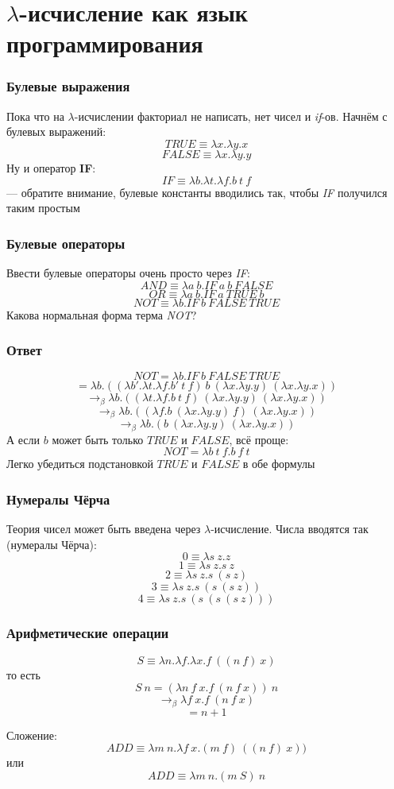 \documentclass[xetex,mathserif,serif]{beamer}
\begin{document}
	\section{$\lambda$-исчисление как язык программирования}

	\begin{frame}
		\frametitle{Булевые выражения}
		Пока что на $\lambda$-исчислении факториал не написать, нет чисел и \textit{if}-ов. Начнём с булевых выражений:
		$$TRUE \equiv \lambda x.\lambda y.x$$
		$$FALSE \equiv \lambda x.\lambda y.y$$
		Ну и оператор \textbf{IF}:
		$$IF \equiv \lambda b.\lambda t.\lambda f.b\ t\ f$$
		--- обратите внимание, булевые константы вводились так, чтобы \textit{IF} получился таким простым
	\end{frame}

	\begin{frame}
		\frametitle{Булевые операторы}
		Ввести булевые операторы очень просто через \textit{IF}:
		$$AND \equiv \lambda a\ b. IF\ a\ b\ FALSE$$
		$$OR \equiv \lambda a\ b. IF\ a\ TRUE\ b$$
		$$NOT \equiv \lambda b.IF\ b\ FALSE\ TRUE$$
		Какова нормальная форма терма \textit{NOT}?
	\end{frame}

	\begin{frame}
		\frametitle{Ответ}
		$$NOT = \lambda b.IF\ b\ FALSE\ TRUE$$
		$$= \lambda b.((\lambda b'.\lambda t.\lambda f.b'\ t\ f)\ b\ (\lambda x.\lambda y.y)\ (\lambda x.\lambda y.x))$$
		$$\rightarrow_\beta \lambda b.((\lambda t.\lambda f.b\ t\ f)\ (\lambda x.\lambda y.y)\ (\lambda x.\lambda y.x))$$
		$$\rightarrow_\beta \lambda b.((\lambda f.b\ (\lambda x.\lambda y.y)\ f)\ (\lambda x.\lambda y.x))$$
		$$\rightarrow_\beta \lambda b.(b\ (\lambda x.\lambda y.y)\ (\lambda x.\lambda y.x))$$
		А если $b$ может быть только $TRUE$ и $FALSE$, всё проще:
		$$NOT = \lambda b\ t\ f.b\ f\ t$$
		Легко убедиться подстановкой $TRUE$ и $FALSE$ в обе формулы
	\end{frame}

	\begin{frame}
		\frametitle{Нумералы Чёрча}
		Теория чисел может быть введена через $\lambda$-исчисление. Числа вводятся так (нумералы Чёрча):
		$$0 \equiv \lambda s\ z.z$$
		$$1 \equiv \lambda s\ z.s\ z$$
		$$2 \equiv \lambda s\ z.s\ (s\ z)$$
		$$3 \equiv \lambda s\ z.s\ (s\ (s\ z))$$
		$$4 \equiv \lambda s\ z.s\ (s\ (s\ (s\ z)))$$
	\end{frame}

	\begin{frame}
		\frametitle{Арифметические операции}
		$$S \equiv \lambda n.\lambda f.\lambda x.f\ ((n\ f)\ x)$$
		то есть
		$$S\ n = (\lambda n\ f\ x.f\ (n\ f\ x))\ n$$
		$$\rightarrow_\beta \lambda f\ x.f\ (n\ f\ x)$$
		$$= n + 1$$
		
		Сложение:
		$$ADD \equiv \lambda m\ n.\lambda f\ x.(m\ f)\ ((n\ f)\ x))$$
		или
		$$ADD \equiv \lambda m\ n.(m\ S)\ n$$
	\end{frame}
\end{document}
